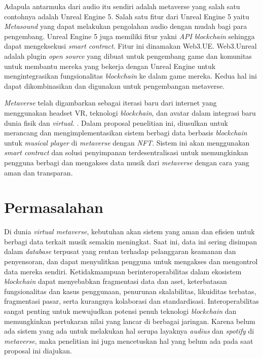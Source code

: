 Adapula antarmuka dari audio itu sendiri adalah metaverse yang salah satu contohnya adalah Unreal Engine 5. Salah satu fitur dari Unreal Engine 5
yaitu \emph{Metasound} yang dapat melakukan pengolahan audio dengan mudah bagi para pengembang. Unreal Engine 5 juga
memiliki fitur yakni \emph{API} \emph{blockchain} sehingga dapat mengeksekusi \emph{smart contract}. Fitur ini dinamakan Web3.UE. Web3.Unreal adalah plugin
\emph{open source} yang dibuat untuk pengembang game dan komunitas untuk membantu mereka yang bekerja dengan Unreal Engine untuk mengintegrasikan
fungsionalitas \emph{blockchain} ke dalam game mereka. Kedua hal ini dapat dikombinasikan dan digunakan untuk
pengembangan metaverse.

\emph{Metaverse} telah digambarkan sebagai iterasi baru dari internet yang menggunakan headset VR, teknologi \emph{blockchain},
dan avatar dalam integrasi baru dunia fisik dan \emph{virtual}. \parencite{DWIVEDI2022102542}. Dalam proposal penelitian ini, diusulkan
untuk merancang dan mengimplementasikan sistem berbagi data berbasis \emph{blockchain}
untuk \emph{musical player} di \emph{metaverse} dengan \emph{NFT}. Sistem ini akan menggunakan \emph{smart contract} dan solusi penyimpanan terdesentralisasi
untuk memungkinkan pengguna berbagi dan mengakses data musik dari \emph{metaverse} dengan cara yang aman dan transparan.

\section{Permasalahan}
\label{sec:permasalahan}

Di dunia \emph{virtual metaverse}, kebutuhan akan sistem yang aman dan efisien untuk berbagi data terkait musik semakin meningkat.
Saat ini, data ini sering disimpan dalam \emph{database} terpusat yang rentan terhadap pelanggaran keamanan dan
penyensoran, dan dapat menyulitkan pengguna untuk mengakses dan mengontrol data mereka sendiri. Ketidakmampuan berinteroperabilitas
dalam ekosistem \emph{blockchain} dapat menyebabkan fragmentasi data dan aset, keterbatasan fungsionalitas dan kasus penggunaan, penurunan skalabilitas,
likuiditas terbatas, fragmentasi pasar, serta kurangnya kolaborasi dan standardisasi. Interoperabilitas sangat penting untuk mewujudkan potensi penuh teknologi
\emph{blockchain} dan memungkinkan pertukaran nilai yang lancar di berbagai jaringan. Karena belum ada sistem yang ada untuk melakukan
hal serupa layaknya \emph{audius} dan \emph{spotify} di \emph{metaverse},
maka penelitian ini juga mencetuskan hal yang belum ada pada saat proposal ini diajukan.

